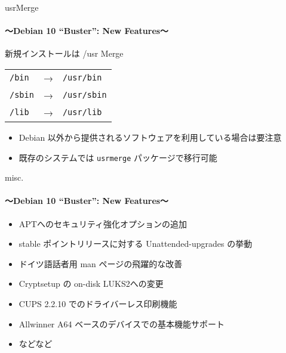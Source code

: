 \documentclass[cjk,c,squeeze,shrink,dvipdfmx,12pt,handout]{beamer}
\begin{document}
\begin{frame}[fragile]{usrMerge}
  \framesubtitle{〜Debian 10 ``Buster'': New Features〜}

  新規インストールは /usr Merge
  \begin{center}
    {\huge{%
        \begin{tabular}{lcl}
          \texttt{/bin}  & → & \texttt{/usr/bin}  \\
          \texttt{/sbin} & → & \texttt{/usr/sbin} \\
          \texttt{/lib}  & → & \texttt{/usr/lib}  \\
        \end{tabular}
      }}
  \end{center}

  \begin{itemize}
  \item Debian 以外から提供されるソフトウェアを利用している場合は要注意
  \item 既存のシステムでは \texttt{usrmerge} パッケージで移行可能
  \end{itemize}
\end{frame}

\begin{frame}[fragile]{misc.}
  \framesubtitle{〜Debian 10 ``Buster'': New Features〜}
  \pause
  \begin{itemize}[<+->]
  \item APTへのセキュリティ強化オプションの追加
  \item stable ポイントリリースに対する Unattended-upgrades の挙動
  \item ドイツ語話者用 man ページの飛躍的な改善
  \item Cryptsetup の on-disk LUKS2への変更
  \item CUPS 2.2.10 でのドライバーレス印刷機能
  \item Allwinner A64 ベースのデバイスでの基本機能サポート
  \item などなど
  \end{itemize}
\end{frame}
\end{document}
